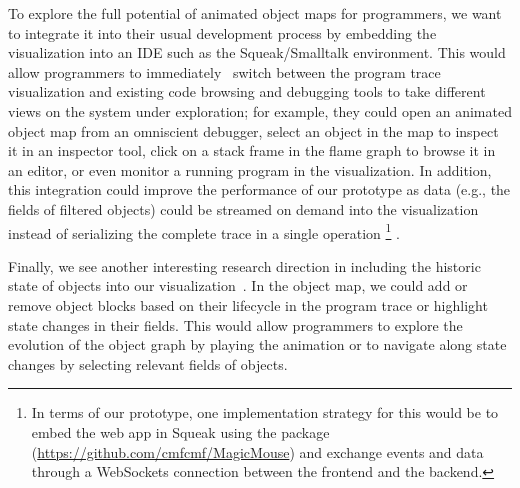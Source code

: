 To explore the full potential of animated object maps for programmers, we want to integrate it into their usual development process by embedding the visualization into an IDE such as the Squeak/Smalltalk environment.
This would allow programmers to immediately~\cite{ungar1997debugging} switch between the program trace visualization and existing code browsing and debugging tools to take different views on the system under exploration; for example, they could open an animated object map from an omniscient debugger, select an object in the map to inspect it in an inspector tool, click on a stack frame in the flame graph to browse it in an editor, or even monitor a running program in the visualization.
In addition, this integration could improve the performance of our prototype as data (e.g., the fields of filtered objects) could be streamed on demand into the visualization instead of serializing the complete trace in a single operation%
\footnote{In terms of our \tfd{} prototype, one implementation strategy for this would be to embed the web app in Squeak using the  package (\url{https://github.com/cmfcmf/MagicMouse}) and exchange events and data through a WebSockets connection between the frontend and the backend.}%
.

Finally, we see another interesting research direction in including the historic state of objects into our visualization~\cite{thiede2023object,thiede2023time}.
In the object map, we could add or remove object blocks based on their lifecycle in the program trace or highlight state changes in their fields.
This would allow programmers to explore the evolution of the object graph by playing the animation or to navigate along state changes by selecting relevant fields of objects.

